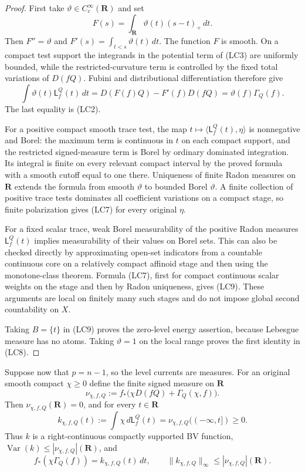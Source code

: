 \begin{proof}
First take $\vartheta\in C_c^\infty(\mathbf R)$ and set
\[
 F(s)=\int_{\mathbf R}\vartheta(t)(s-t)_+\,dt.
\]
Then $F''=\vartheta$ and
$F'(s)=\int_{t<s}\vartheta(t)\,dt$.  The function $F$ is
smooth.  On a compact test support the integrands in the
potential term of (LC3) are uniformly bounded, while the
restricted-curvature term is controlled by the fixed total
variations of $D(fQ)$.  Fubini and distributional differentiation
therefore give
\[
 \int\vartheta(t)\mathsf L^Q_f(t)\,dt
      =D(F(f)Q)-F'(f)D(fQ)
      =\vartheta(f)\Gamma_Q(f).
\]
The last equality is (LC2).

For a positive compact smooth trace test, the map
$t\mapsto\langle\mathsf L^Q_f(t),\eta\rangle$ is
nonnegative and Borel: the maximum term is continuous in $t$
on each compact support, and the restricted signed-measure term
is Borel by ordinary dominated integration.  Its integral is
finite on every relevant compact interval by the proved formula
with a smooth cutoff equal to one there.  Uniqueness of finite
Radon measures on $\mathbf R$ extends the formula from smooth
$\vartheta$ to bounded Borel $\vartheta$.  A finite collection
of positive trace tests dominates all coefficient variations
on a compact stage, so finite polarization gives (LC7) for
every original $\eta$.

For a fixed scalar trace, weak Borel measurability of the positive
Radon measures $\mathsf L^Q_f(t)$ implies measurability of their
values on Borel sets.  This can also be checked directly by
approximating open-set indicators from a countable continuous
core on a relatively compact affinoid stage and then using the
monotone-class theorem.  Formula (LC7), first for compact
continuous scalar weights on the stage and then by Radon
uniqueness, gives (LC9).  These arguments are local on finitely
many such stages and do not impose global second countability
on $X$.

Taking $B=\{t\}$ in (LC9) proves the zero-level energy assertion,
because Lebesgue measure has no atoms.  Taking $\vartheta=1$
on the local range proves the first identity in (LC8).
\end{proof}

\begin{corollary}
\label{cor:r11-energy-bv-density}
Suppose now that $p=n-1$, so the level currents are measures.
For an original smooth compact $\chi\ge0$ define the finite
signed measure on $\mathbf R$
\[
 \nu_{\chi,f,Q}
  :=f_*\bigl(\chi D(fQ)+\Gamma_Q(\chi,f)\bigr).
 \tag{LC10}
\]
Then $\nu_{\chi,f,Q}(\mathbf R)=0$, and for every $t\in\mathbf R$
\[
 k_{\chi,f,Q}(t):=\int\chi\,d\mathsf L^Q_f(t)
       =\nu_{\chi,f,Q}(( -\infty,t])\ge0.
 \tag{LC11}
\]
Thus $k$ is a right-continuous compactly supported BV function,
$\operatorname{Var}(k)\le|\nu_{\chi,f,Q}|(\mathbf R)$, and
\[
 f_*(\chi\Gamma_Q(f))=k_{\chi,f,Q}(t)\,dt,
 \qquad
 \|k_{\chi,f,Q}\|_\infty
                     \le|\nu_{\chi,f,Q}|(\mathbf R).
 \tag{LC12}
\]
\end{corollary}

